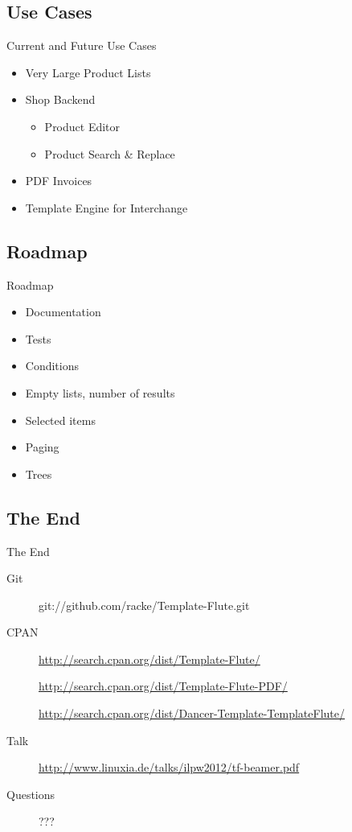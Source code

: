 \subsection{Use Cases}
\begin{frame}{Current and Future Use Cases}
  \begin{itemize}
  \item Very Large Product Lists
  \item Shop Backend
    \begin{itemize}
    \item Product Editor
    \item Product Search \& Replace
    \end{itemize}
  \item PDF Invoices
  \item Template Engine for Interchange
 \end{itemize}
\end{frame}

\subsection{Roadmap}
\begin{frame}{Roadmap}
 \begin{itemize}
   \item Documentation
   \item Tests
   \item Conditions
   \item Empty lists, number of results
   \item Selected items
   \item Paging
   \item Trees 
 \end{itemize}
\end{frame}

\subsection{The End}
\begin{frame}{The End}
 \begin{description}
  \item[Git] git://github.com/racke/Template-Flute.git
  \item[CPAN] \url{http://search.cpan.org/dist/Template-Flute/}
  \item[]   \url{http://search.cpan.org/dist/Template-Flute-PDF/}
  \item[]   \url{http://search.cpan.org/dist/Dancer-Template-TemplateFlute/}
  \item[Talk]
    \url{http://www.linuxia.de/talks/ilpw2012/tf-beamer.pdf}
   \item[Questions] ???
 \end{description}
\end{frame}



